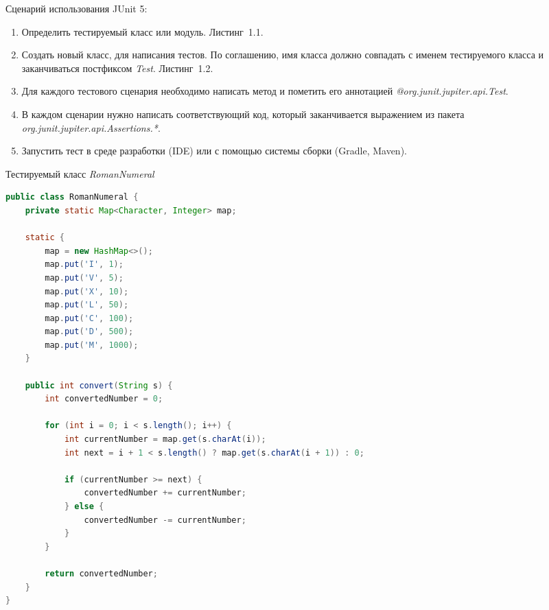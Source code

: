 Сценарий использования JUnit 5: 

\begin{enumerate}
	\item Определить тестируемый класс или модуль. Листинг~1.1.
	\item Создать новый класс, для написания тестов. По соглашению, имя класса должно совпадать с именем тестируемого класса и заканчиваться постфиксом \textit{Test}. Листинг~1.2.
	\item Для каждого тестового сценария необходимо написать метод и пометить его аннотацией \textit{@org.junit.jupiter.api.Test}.
	\item В каждом сценарии нужно написать соответствующий код, который заканчивается выражением из пакета \textit{org.junit.jupiter.api.Assertions.*}. 
	\item Запустить тест в среде разработки (IDE) или с помощью системы сборки (Gradle, Maven).
\end{enumerate}

\begin{ListingEnv}[!h]%
	\captiondelim{ } %
	\caption{Тестируемый класс \textit{RomanNumeral}}
	\begin{lstlisting}[language={Java}]
public class RomanNumeral {
	private static Map<Character, Integer> map;
	
	static {
		map = new HashMap<>();
		map.put('I', 1);
		map.put('V', 5);
		map.put('X', 10);
		map.put('L', 50);
		map.put('C', 100);
		map.put('D', 500);
		map.put('M', 1000);
	}
	
	public int convert(String s) {
		int convertedNumber = 0;
		
		for (int i = 0; i < s.length(); i++) {
			int currentNumber = map.get(s.charAt(i));
			int next = i + 1 < s.length() ? map.get(s.charAt(i + 1)) : 0;
			
			if (currentNumber >= next) {
				convertedNumber += currentNumber;
			} else {
				convertedNumber -= currentNumber;
			}
		}
		
		return convertedNumber;
	}
}
	\end{lstlisting}
\end{ListingEnv}%

